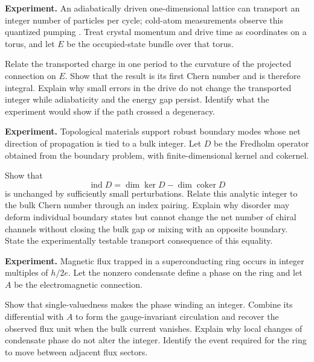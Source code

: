 \begin{exercise}
\textbf{Experiment.}
An adiabatically driven one-dimensional lattice can transport an integer
number of particles per cycle; cold-atom measurements observe this quantized
pumping \cite{lohse}.  Treat crystal momentum and drive time as coordinates on
a torus, and let \(E\) be the occupied-state bundle over that torus.

Relate the transported charge in one period to the curvature of the projected
connection on \(E\).  Show that the result is its first Chern number and is
therefore integral.  Explain why small errors in the drive do not change the
transported integer while adiabaticity and the energy gap persist.  Identify
what the experiment would show if the path crossed a degeneracy.
\end{exercise}

\begin{exercise}
\textbf{Experiment.}
Topological materials support robust boundary modes whose net direction of
propagation is tied to a bulk integer.  Let \(D\) be the Fredholm operator
obtained from the boundary problem, with finite-dimensional kernel and
cokernel.

Show that
\[
        \operatorname{ind}D=\dim\ker D-\dim\operatorname{coker}D
\]
is unchanged by sufficiently small perturbations.  Relate this analytic
integer to the bulk Chern number through an index pairing.  Explain why
disorder may deform individual boundary states but cannot change the net
number of chiral channels without closing the bulk gap or mixing with an
opposite boundary.  State the experimentally testable transport consequence
of this equality.
\end{exercise}

\begin{exercise}
\textbf{Experiment.}
Magnetic flux trapped in a superconducting ring occurs in integer multiples
of \(h/2e\).  Let the nonzero condensate define a phase on the ring and let
\(A\) be the electromagnetic connection.

Show that single-valuedness makes the phase winding an integer.  Combine its
differential with \(A\) to form the gauge-invariant circulation and recover
the observed flux unit when the bulk current vanishes.  Explain why local
changes of condensate phase do not alter the integer.  Identify the event
required for the ring to move between adjacent flux sectors.
\end{exercise}

